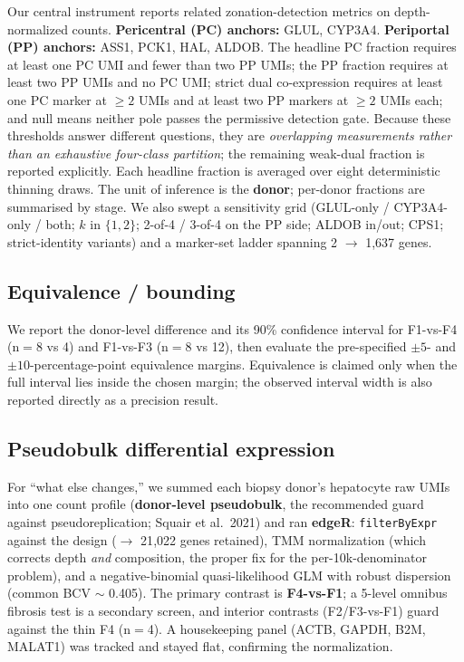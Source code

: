 \documentclass[11pt,a4paper]{article}
\begin{document}
Our central instrument reports related zonation-detection metrics on depth-normalized counts. \textbf{Pericentral (PC) anchors:} GLUL, CYP3A4. \textbf{Periportal (PP) anchors:} ASS1, PCK1, HAL, ALDOB. The headline PC fraction requires at least one PC UMI and fewer than two PP UMIs; the PP fraction requires at least two PP UMIs and no PC UMI; strict dual co-expression requires at least one PC marker at $\ge2$ UMIs and at least two PP markers at $\ge2$ UMIs each; and null means neither pole passes the permissive detection gate. Because these thresholds answer different questions, they are \emph{overlapping measurements rather than an exhaustive four-class partition}; the remaining weak-dual fraction is reported explicitly. Each headline fraction is averaged over eight deterministic thinning draws. The unit of inference is the \textbf{donor}; per-donor fractions are summarised by stage. We also swept a sensitivity grid (GLUL-only / CYP3A4-only / both; $k$ in $\{1,2\}$; 2-of-4 / 3-of-4 on the PP side; ALDOB in/out; CPS1; strict-identity variants) and a marker-set ladder spanning 2 $\to$ 1{,}637 genes.

\subsection{Equivalence / bounding}

We report the donor-level difference and its 90\% confidence interval for F1-vs-F4 (n$=$8 vs 4) and F1-vs-F3 (n$=$8 vs 12), then evaluate the pre-specified $\pm5$- and $\pm10$-percentage-point equivalence margins. Equivalence is claimed only when the full interval lies inside the chosen margin; the observed interval width is also reported directly as a precision result.

\subsection{Pseudobulk differential expression}

For ``what else changes,'' we summed each biopsy donor's hepatocyte raw UMIs into one count profile (\textbf{donor-level pseudobulk}, the recommended guard against pseudoreplication; Squair et al.\ 2021) and ran \textbf{edgeR}: \texttt{filterByExpr} against the design ($\to$ 21{,}022 genes retained), TMM normalization (which corrects depth \emph{and} composition, the proper fix for the per-10k-denominator problem), and a negative-binomial quasi-likelihood GLM with robust dispersion (common BCV $\sim$ 0.405). The primary contrast is \textbf{F4-vs-F1}; a 5-level omnibus fibrosis test is a secondary screen, and interior contrasts (F2/F3-vs-F1) guard against the thin F4 (n$=$4). A housekeeping panel (ACTB, GAPDH, B2M, MALAT1) was tracked and stayed flat, confirming the normalization.
\end{document}
